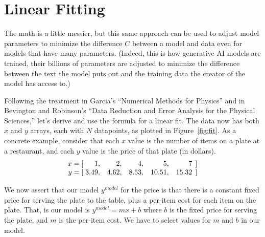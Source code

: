 \documentclass[12pt]{article}
\begin{document}
\section{Linear Fitting}

The math is a little messier, but this same approach can be used to adjust model parameters to minimize the difference $C$ between a model and data even for models that have many parameters. (Indeed, this is how generative AI models are trained, their billions of parameters are adjusted to minimize the difference between the text the model puts out and the training data the creator of the model has access to.)

Following the treatment in Garcia's ``Numerical Methods for Physics'' and in Bevington and Robinson's ``Data Reduction and Error Analysis for the Physical Sciences,'' let's derive and use the formula for a linear fit. The data now has both $x$ and $y$ arrays, each with $N$ datapoints, as plotted in Figure~\ref{fig:fit}. As a concrete example, consider that each $x$ value is the number of items on a plate at a restaurant, and each $y$ value is the price of that plate (in dollars).
\begin{equation}
\begin{array}{r @{\;} c @{\;} l @{\;} r @{\quad} r @{\quad} r @{\quad} r @{\quad} r @{\;\,} l}
x & = & [ & 1, & 2, & 4, & 5, & 7 & ] \\
y & = & [ & 3.49, & 4.62, & 8.53, & 10.51, & 15.32 & ]
\end{array}
\end{equation}

We now assert that our model $y^{model}$ for the price is that there is a constant fixed price for serving the plate to the table, plus a per-item cost for each item on the plate. That, is our model is $y^{model} = mx + b$ where $b$ is the fixed price for serving the plate, and $m$ is the per-item cost. We have to select values for $m$ and $b$ in our model.
\end{document}
